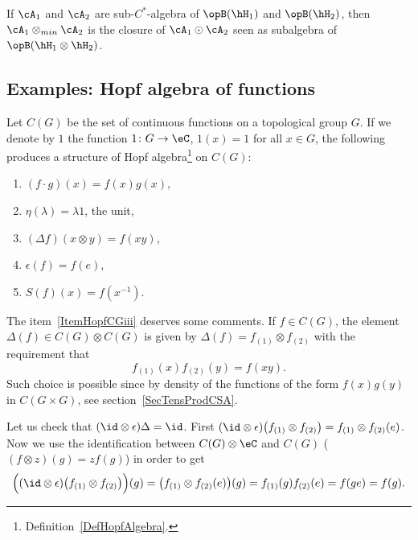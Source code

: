 \begin{lemma}
    If $\cA_1$ and $\cA_2$ are sub-$C^*$-algebra of $\opB(\hH_1)$ and $\opB(\hH_2)$, then $\cA_1\otimes_{min}\cA_2$ is the closure of $\cA_1\odot\cA_2$ seen as subalgebra of $\opB(\hH_1\otimes\hH_2)$.
\end{lemma}

\subsection{Examples: Hopf algebra of functions}

\begin{definition}		\label{DefHopfsurCG}
    Let $C(G)$ be the set of continuous functions on a topological group $G$. If we denote by $1$ the function $1\colon G\to \eC$, $1(x)=1$ for all $x\in G$, the following produces a structure of Hopf algebra\footnote{Definition~\ref{DefHopfAlgebra}.} on $C(G)$:
\begin{enumerate}
		\item
			$(f\cdot g)(x)=f(x)g(x)$,
		\item
			$\eta(\lambda)=\lambda 1$, the unit,
		\item\label{ItemHopfCGiii}
			$(\Delta f)(x\otimes y)=f(xy)$,
		\item\label{ItemHopfCGiv}
			$\epsilon(f)=f(e)$,
		\item
			$S(f)(x)=f(x^{-1})$.
	\end{enumerate}
\end{definition}

The item~\ref{ItemHopfCGiii} deserves some comments. If $f\in C(G)$, the element $\Delta(f)\in C(G)\otimes C(G)$ is given by $\Delta(f)=f_{(1)}\otimes f_{(2)}$ with the requirement that
\begin{equation}
	f_{(1)}(x)f_{(2)}(y)=f(xy).
\end{equation}
Such choice is possible since by density of the functions of the form $f(x)g(y)$ in $C(G\times G)$, see section~\ref{SecTensProdCSA}.

Let us check that $(\id\otimes\epsilon)\Delta=\id$. First $(\id\otimes\epsilon)\big( f_{(1)}\otimes f_{(2)} \big)=f_{(1)}\otimes f_{(2)}(e)$. Now we use the identification between $C(G)\otimes \eC$ and $C(G)$ ($(f\otimes z)(g)=zf(g)$) in order to get
\begin{equation}
	\Big( (\id\otimes\epsilon)\big( f_{(1)}\otimes f_{(2)} \big) \Big)(g)=\big( f_{(1)}\otimes f_{(2)}(e) \big)(g)=f_{(1)}(g)f_{(2)}(e)=f(ge)=f(g).
\end{equation}

